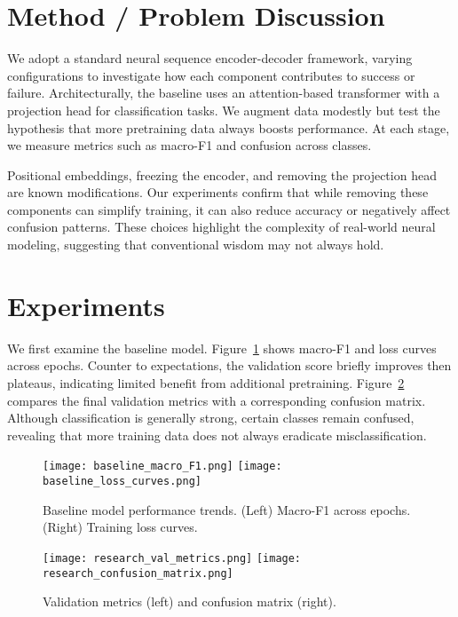 \documentclass[11pt]{article}
\begin{document}
\section{Method / Problem Discussion}
We adopt a standard neural sequence encoder-decoder framework, varying configurations to investigate how each component contributes to success or failure. Architecturally, the baseline uses an attention-based transformer with a projection head for classification tasks. We augment data modestly but test the hypothesis that more pretraining data always boosts performance. At each stage, we measure metrics such as macro-F1 and confusion across classes.

Positional embeddings, freezing the encoder, and removing the projection head are known modifications. Our experiments confirm that while removing these components can simplify training, it can also reduce accuracy or negatively affect confusion patterns. These choices highlight the complexity of real-world neural modeling, suggesting that conventional wisdom may not always hold.

\section{Experiments}
We first examine the baseline model. Figure~\ref{fig:main1} shows macro-F1 and loss curves across epochs. Counter to expectations, the validation score briefly improves then plateaus, indicating limited benefit from additional pretraining. Figure~\ref{fig:main2} compares the final validation metrics with a corresponding confusion matrix. Although classification is generally strong, certain classes remain confused, revealing that more training data does not always eradicate misclassification.

\begin{figure}[t]
\centering
\texttt{[image: baseline\_macro\_F1.png]}
\hfill
\texttt{[image: baseline\_loss\_curves.png]}
\caption{Baseline model performance trends. (Left) Macro-F1 across epochs. (Right) Training loss curves.}
\label{fig:main1}
\end{figure}

\begin{figure}[t]
\centering
\texttt{[image: research\_val\_metrics.png]}
\hfill
\texttt{[image: research\_confusion\_matrix.png]}
\caption{Validation metrics (left) and confusion matrix (right).}
\label{fig:main2}
\end{figure}
\end{document}
